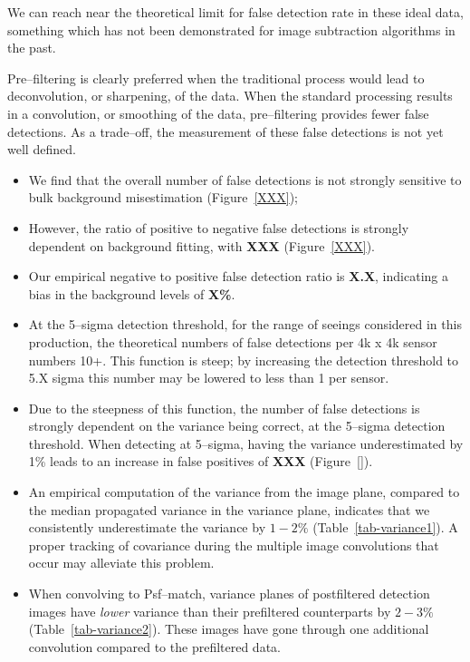 \documentclass[prd, nofootinbib, floatfix, 11pt,tightenlines,times]{article}
\begin{document}
We can reach near the theoretical limit for false detection rate in
these ideal data, something which has not been demonstrated for image
subtraction algorithms in the past.

Pre--filtering is clearly preferred when the traditional process would
lead to deconvolution, or sharpening, of the data.  When the standard
processing results in a convolution, or smoothing of the data,
pre--filtering provides fewer false detections.  As a trade--off, the
measurement of these false detections is not yet well defined.

\begin{itemize}

\item We find that the overall number of false detections is not
  strongly sensitive to bulk background misestimation
  (Figure~\ref{XXX});

\item However, the ratio of positive to negative false detections is
  strongly dependent on background fitting, with {\bf XXX}
  (Figure~\ref{XXX}).

\item Our empirical negative to positive false detection ratio is {\bf
  X.X}, indicating a bias in the background levels of {\bf X\%}.

\item At the 5--sigma detection threshold, for the range of seeings
  considered in this production, the theoretical numbers of false
  detections per 4k x 4k sensor numbers 10+.  This function is steep;
  by increasing the detection threshold to 5.X sigma this number may
  be lowered to less than 1 per sensor.

\item Due to the steepness of this function, the number of false
  detections is strongly dependent on the variance being correct, at
  the 5--sigma detection threshold.  When detecting at 5--sigma,
  having the variance underestimated by 1\% leads to an increase
  in false positives of {\bf XXX} (Figure~\ref{}).

\item An empirical computation of the variance from the image plane,
  compared to the median propagated variance in the variance plane,
  indicates that we consistently underestimate the variance by $1-2\%$
  (Table~\ref{tab-variance1}).  A proper tracking of covariance during
  the multiple image convolutions that occur may alleviate this
  problem.

\item When convolving to Psf--match, variance planes of postfiltered
  detection images have {\it lower} variance than their prefiltered
  counterparts by $2-3\%$ (Table~\ref{tab-variance2}).  These images
  have gone through one additional convolution compared to the
  prefiltered data.


\end{itemize}
\end{document}
